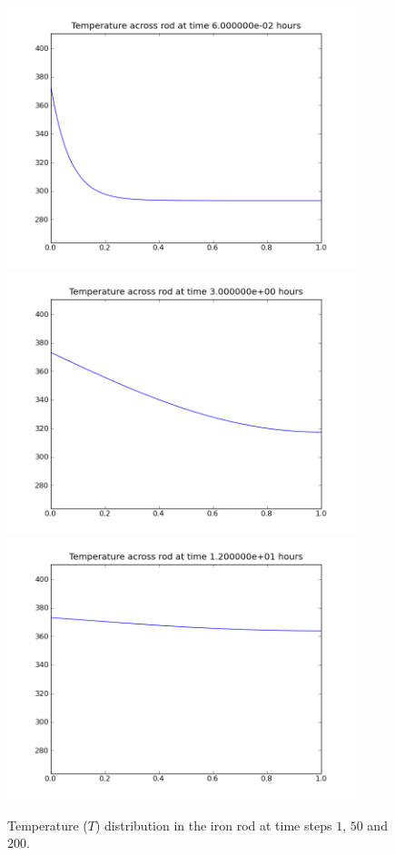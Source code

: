 \begin{figure}
\begin{center}
\includegraphics[width=4in]{figures/rodpyplot001}
\includegraphics[width=4in]{figures/rodpyplot050}
\includegraphics[width=4in]{figures/rodpyplot200}
\caption{Temperature ($T$) distribution in the iron rod at time steps $1$, $50$ and $200$.}
\label{fig:onedheatout 002} 
\end{center}
\end{figure}

